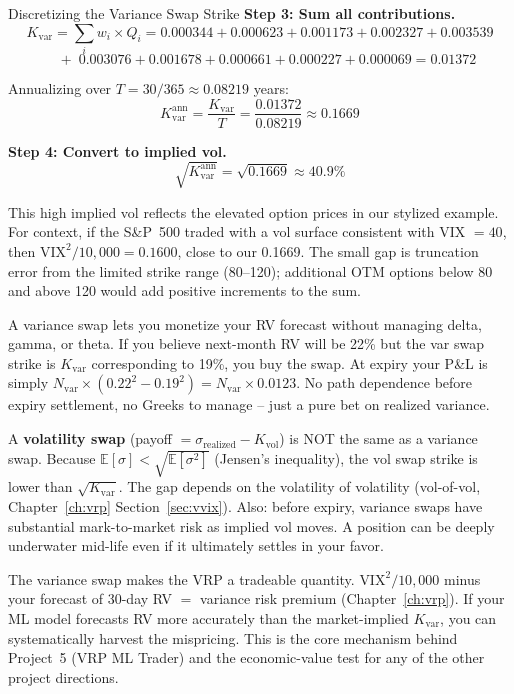 \begin{workedexample}{Discretizing the Variance Swap Strike}
\textbf{Step 3: Sum all contributions.}
\[
  K_{\text{var}} = \sum_i w_i \times Q_i = 0.000344 + 0.000623 + 0.001173 + 0.002327 + 0.003539
\]
\[
  \quad + \; 0.003076 + 0.001678 + 0.000661 + 0.000227 + 0.000069 = 0.01372
\]

Annualizing over $T = 30/365 \approx 0.08219$ years:
\[
  K_{\text{var}}^{\text{ann}} = \frac{K_{\text{var}}}{T} = \frac{0.01372}{0.08219} \approx 0.1669
\]

\textbf{Step 4: Convert to implied vol.}
\[
  \sqrt{K_{\text{var}}^{\text{ann}}} = \sqrt{0.1669} \approx 40.9\%
\]

This high implied vol reflects the elevated option prices in our stylized example.
For context, if the S\&P~500 traded with a vol surface consistent with VIX $= 40$, then $\text{VIX}^2/10{,}000 = 0.1600$, close to our 0.1669.
The small gap is truncation error from the limited strike range (80--120); additional OTM options below 80 and above 120 would add positive increments to the sum.
\end{workedexample}

\begin{intuition}
A variance swap lets you monetize your RV forecast without managing delta, gamma, or theta.
If you believe next-month RV will be 22\% but the var swap strike is $K_{\text{var}}$ corresponding to 19\%, you buy the swap.
At expiry your P\&L is simply $N_{\text{var}} \times (0.22^2 - 0.19^2) = N_{\text{var}} \times 0.0123$.
No path dependence before expiry settlement, no Greeks to manage -- just a pure bet on realized variance.
\end{intuition}

\begin{warning}
A \textbf{volatility swap} (payoff $= \sigma_{\text{realized}} - K_{\text{vol}}$) is NOT the same as a variance swap.
Because $\mathbb{E}[\sigma] < \sqrt{\mathbb{E}[\sigma^2]}$ (Jensen's inequality), the vol swap strike is lower than $\sqrt{K_{\text{var}}}$.
The gap depends on the volatility of volatility (vol-of-vol, Chapter~\ref{ch:vrp} Section~\ref{sec:vvix}).
Also: before expiry, variance swaps have substantial mark-to-market risk as implied vol moves.
A position can be deeply underwater mid-life even if it ultimately settles in your favor.
\end{warning}

\begin{projectconnection}
The variance swap makes the VRP a tradeable quantity.
$\text{VIX}^2/10{,}000$ minus your forecast of 30-day RV $=$ variance risk premium (Chapter~\ref{ch:vrp}).
If your ML model forecasts RV more accurately than the market-implied $K_{\text{var}}$, you can systematically harvest the mispricing.
This is the core mechanism behind Project~5 (VRP ML Trader) and the economic-value test for any of the other project directions.
\end{projectconnection}


